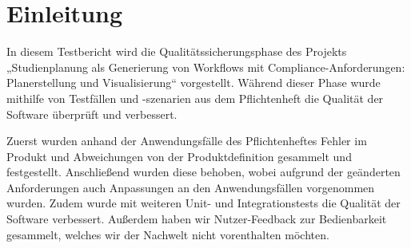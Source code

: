 \section{Einleitung}

In diesem Testbericht wird die Qualitätssicherungsphase des Projekts „Studienplanung als Generierung von Workflows mit Compliance-Anforderungen: Planerstellung und Visualisierung“ vorgestellt. Während dieser Phase wurde mithilfe von Testfällen und -szenarien aus dem Pflichtenheft die Qualität der Software überprüft und verbessert.

Zuerst wurden anhand der Anwendungsfälle des Pflichtenheftes Fehler im Produkt und Abweichungen von der Produktdefinition gesammelt und festgestellt. Anschließend wurden diese behoben, wobei aufgrund der geänderten Anforderungen auch Anpassungen an den Anwendungsfällen vorgenommen wurden. Zudem wurde mit weiteren Unit- und Integrationstests die Qualität der Software verbessert. Außerdem haben wir Nutzer-Feedback zur Bedienbarkeit gesammelt, welches wir der Nachwelt nicht vorenthalten möchten.